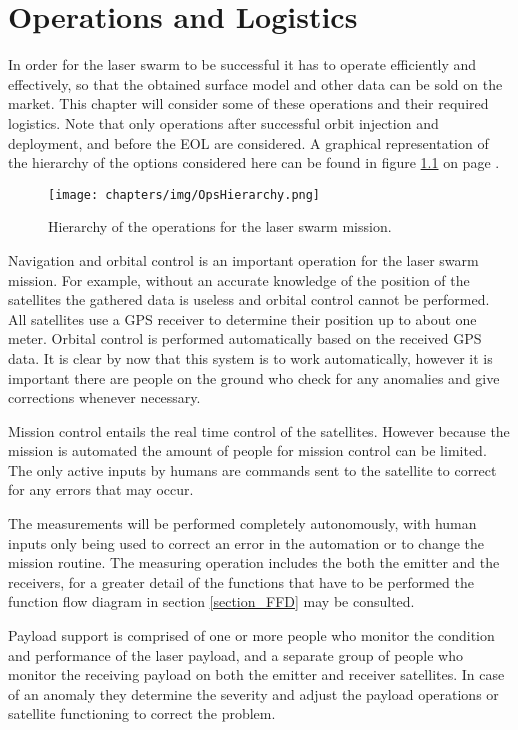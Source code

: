 \chapter{Operations and Logistics}
\label{OperationsLogistics}

In order for the laser swarm to be successful it has to operate efficiently and effectively, so that the obtained surface model and other data can be sold on the market. This chapter will consider some of these operations and their required logistics. Note that only operations after successful orbit injection and deployment, and before the \ac{EOL} are considered. A graphical representation of the hierarchy of the options considered here can be found in figure \ref{fig:OpsHier} on page \pageref{fig:OpsHier}.

\begin{figure}
\centering
\texttt{[image: chapters/img/OpsHierarchy.png]}
\caption{Hierarchy of the operations for the laser swarm mission.}
\label{fig:OpsHier}
\end{figure}

Navigation and orbital control is an important operation for the laser swarm mission. For example, without an accurate knowledge of the position of the satellites the gathered data is useless and orbital control cannot be performed. All satellites use a \acs{GPS} receiver to determine their position up to about one meter. Orbital control is performed automatically based on the received \acs{GPS} data. It is clear by now that this system is to work automatically, however it is important there are people on the ground who check for any anomalies and give corrections whenever necessary.

Mission control entails the real time control of the satellites. However because the mission is automated the amount of people for mission control can be limited. The only active inputs by humans are commands sent to the satellite to correct for any errors that may occur.

The measurements will be performed completely autonomously, with human inputs only being used to correct an error in the automation or to change the mission routine. The measuring operation includes the both the emitter and the receivers, for a greater detail of the functions that have to be performed the function flow diagram in section \ref{section_FFD} may be consulted.

Payload support is comprised of one or more people who monitor the condition and performance of the laser payload, and a separate group of people who monitor the receiving payload on both the emitter and receiver satellites. In case of an anomaly they determine the severity and adjust the payload operations or satellite functioning to correct the problem.

